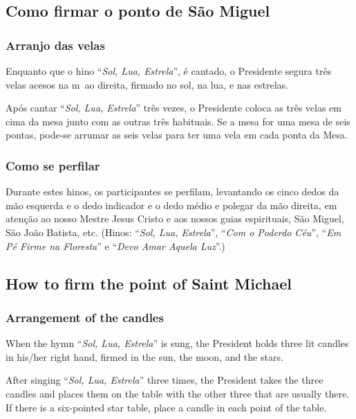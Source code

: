 {\clearpage
\subsection*{Como firmar o ponto de São Miguel}

\subsubsection*{Arranjo das velas}

Enquanto que o hino ``\textit{Sol, Lua, Estrela}'', é cantado, o Presidente
segura três velas acesos na m~ao direita, firmado no sol, na lua, e nas
estrelas.

Após cantar ``\textit{Sol, Lua, Estrela}'' três vezes, o Presidente coloca as
três velas em cima da mesa junto com as outras três habituais. Se a mesa for uma
mesa de seis pontas, pode-se arrumar as seis velas para ter uma vela em cada
ponta da Mesa.

\subsubsection*{Como se perfilar}

Durante estes hinos, os participantes se perfilam, levantando os cinco dedos
da mão esquerda e o dedo indicador e o dedo médio e polegar da mão direita,
em atenção ao nosso Mestre Jesus Cristo e aos nossos guias espirituais, São
Miguel, São João Batista, etc. (Hinos: ``\textit{Sol, Lua, Estrela}'',
``\textit{Com o Poderdo Céu}'', ``\textit{Em Pé Firme na Floresta}'' e
``\textit{Devo Amar Aquela Luz}''.)


\subsection*{How to firm the point of Saint Michael}

\subsubsection*{Arrangement of the candles}

When the hymn ``\textit{Sol, Lua, Estrela}'' is sung, the President holds three
lit candles in his/her right hand, firmed in the sun, the moon, and the stars.

After singing ``\textit{Sol, Lua, Estrela}'' three times, the President takes
the three candles and places them on the table with the other three that are
usually there. If there is a six-pointed star table, place a candle in each
point of the table.

}
